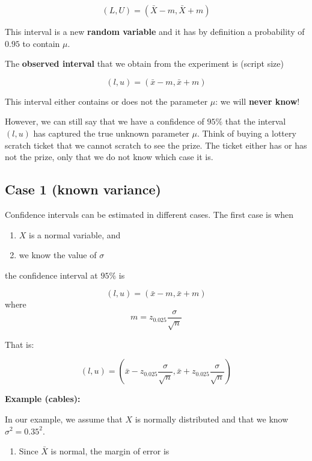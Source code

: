 \documentclass[
]{book}
\providecommand{\tightlist}{%
  \setlength{\itemsep}{0pt}\setlength{\parskip}{0pt}}
\begin{document}
\[(L,U)=(\bar{X} - m,\bar{X} + m)\]

This interval is a new \textbf{random variable} and it has by definition a probability of \(0.95\) to contain \(\mu\).

The \textbf{observed interval} that we obtain from the experiment is (script size)

\[(l,u)=(\bar{x} - m,\bar{x} + m)\]

This interval either contains or does not the parameter \(\mu\): we will \textbf{never know}!

However, we can still say that we have a confidence of \(95\%\) that the interval \((l,u)\) has captured the true unknown parameter \(\mu\). Think of buying a lottery scratch ticket that we cannot scratch to see the prize. The ticket either has or has not the prize, only that we do not know which case it is.

\hypertarget{case-1-known-variance}{%
\subsection{Case 1 (known variance)}\label{case-1-known-variance}}

Confidence intervals can be estimated in different cases. The first case is when

\begin{enumerate}
\def\labelenumi{\arabic{enumi}.}
\tightlist
\item
  \(X\) is a normal variable, and
\item
  we know the value of \(\sigma\)
\end{enumerate}

the confidence interval at \(95\%\) is

\[(l,u)=(\bar{x} - m, \bar{x} + m)\]
where \[m=z_{0.025} \frac{\sigma}{\sqrt{n}}\]

That is:

\[(l,u)=(\bar{x} - z_{0.025} \frac{\sigma}{\sqrt{n}}, \bar{x} + z_{0.025} \frac{\sigma}{\sqrt{n}})\]

\textbf{Example (cables):}

In our example, we assume that \(X\) is normally distributed and that we know \(\sigma^2=0.35^2\).

\begin{enumerate}
\def\labelenumi{\arabic{enumi}.}
\tightlist
\item
  Since \(\bar{X}\) is normal, the margin of error is
\end{enumerate}
\end{document}
